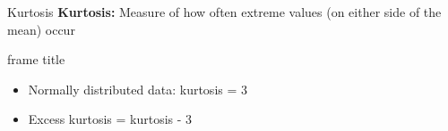 \begin{frame}[t]{Kurtosis}
\vfill
\centering
\textbf{Kurtosis:} 
Measure of how often extreme values (on either side of
the mean) occur
\end{frame}


\begin{frame}[t]{frame title}
	\begin{itemize}
		\item Normally distributed data: kurtosis = 3
		\item Excess kurtosis = kurtosis - 3
	\end{itemize}
\end{frame}